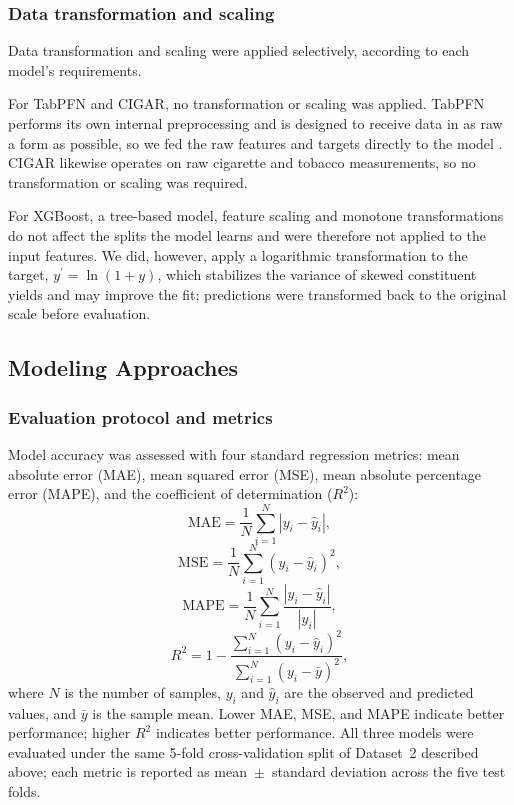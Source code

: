 \documentclass[11pt]{article}
\begin{document}
\subsubsection*{Data transformation and scaling}

Data transformation and scaling were applied selectively, according to each model's requirements.

For TabPFN and CIGAR, no transformation or scaling was applied. TabPFN performs its
own internal preprocessing and is designed to receive data in as raw a form as
possible, so we fed the raw features and targets directly to the model \cite{priorlabs2025performance}. CIGAR likewise operates on raw cigarette and tobacco measurements, so no transformation or scaling was required.

For XGBoost, a tree-based model, feature scaling and monotone transformations
do not affect the splits the model learns and were therefore not applied to
the input features. We did, however, apply a logarithmic transformation to the
target, $y^\prime=\ln(1+y)$, which stabilizes the variance of skewed
constituent yields and may improve the fit; predictions were transformed back
to the original scale before evaluation.

\subsection*{Modeling Approaches}

\subsubsection*{Evaluation protocol and metrics}

Model accuracy was assessed with four standard regression metrics: mean
absolute error (MAE), mean squared error (MSE), mean absolute percentage
error (MAPE), and the coefficient of determination ($R^2$):
\[
\mathrm{MAE}=\frac{1}{N}\sum_{i=1}^{N}\left|y_i-\hat{y}_i\right|,
\]
\[
\mathrm{MSE}=\frac{1}{N}\sum_{i=1}^{N}\left(y_i-\hat{y}_i\right)^2,
\]
\[
\mathrm{MAPE}=\frac{1}{N}\sum_{i=1}^{N}\frac{\left|y_i-\hat{y}_i\right|}{\left|y_i\right|},
\]
\[
R^2=1-\frac{\sum_{i=1}^{N}\left(y_i-\hat{y}_i\right)^2}{\sum_{i=1}^{N}\left(y_i-\bar{y}\right)^2},
\]
where $N$ is the number of samples, $y_i$ and $\hat{y}_i$ are the observed
and predicted values, and $\bar{y}$ is the sample mean. Lower MAE, MSE,
and MAPE indicate better performance; higher $R^2$ indicates better
performance. All three models were evaluated under the same 5-fold
cross-validation split of Dataset~2 described above; each metric is
reported as mean~$\pm$~standard deviation across the five test folds.
\end{document}

